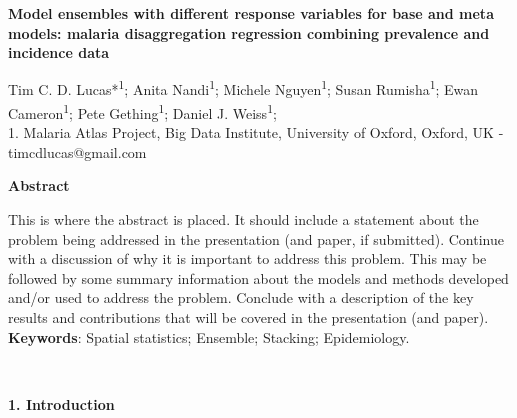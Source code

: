 \documentclass[11pt]{article}
\begin{document}
\templatefigures{}



\small{

\begin{center}
\textbf{Model ensembles with different response variables for base and meta models: malaria disaggregation regression combining prevalence and incidence data}
\end{center}



\begin{center}
{Tim C. D. Lucas*\textsuperscript{1}; Anita Nandi\textsuperscript{1}; Michele Nguyen\textsuperscript{1}; 
Susan Rumisha\textsuperscript{1}; Ewan Cameron\textsuperscript{1}; Pete Gething\textsuperscript{1}; Daniel J. Weiss\textsuperscript{1};}\\
{1. Malaria Atlas Project, Big Data Institute, University of Oxford, Oxford, UK - timcdlucas@gmail.com}\\ 


\end{center}

\begin{center}
{\bf Abstract}
\end{center}

\setlength{\parindent}{0pt}

This is where the abstract is placed. It should include a statement about the problem being addressed in the presentation (and paper, if submitted). Continue with a discussion of why it is important to address this problem. This may be followed by some summary information about the models and methods developed and/or used to address the problem. Conclude with a description of the key results and contributions that will be covered in the presentation (and paper).\\


{\bf Keywords}: Spatial statistics; Ensemble; Stacking; Epidemiology.
}\\


\setlength{\parindent}{0pt}

{\bf 1. Introduction}


\end{document}
